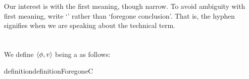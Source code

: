 \begin{note}
  Our interest is with the first meaning, though narrow.
  To avoid ambiguity with first meaning, write `' rather than `foregone conclusion'.
  That is, the hyphen signifies when we are speaking about the technical term.
\end{note}

\section{}
\label{cha:sec:fcs-def}

\begin{note}[\fc{2} definition]
  We define \(\langle \phi, v \rangle\) being a \emph{} as follows:

  \begin{restatable}[\fc{3}]{definition}{definitionForegoneC}
    \label{def:fc}


\end{restatable}
\end{note}
